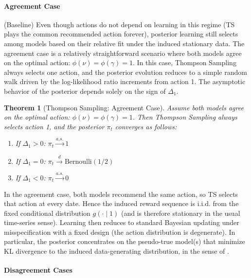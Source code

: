 \documentclass[12pt]{article}
\newtheorem{theorem}{Theorem}
\begin{document}
\paragraph{Agreement Case} (Baseline) Even though actions do not depend on learning in this regime (TS plays the common recommended action forever), posterior learning still selects among models based on their relative fit under the induced stationary data. The agreement case is a relatively straightforward scenario where both models agree on the optimal action: $\phi(\nu) = \phi(\gamma) = 1$. In this case, Thompson Sampling always selects one action, and the posterior evolution reduces to a simple random walk driven by the log-likelihood ratio increments from action 1. The asymptotic behavior of the posterior depends solely on the sign of $\Delta_1$.

\begin{theorem}[Thompson Sampling: Agreement Case]
\label{thm:agreement_case}
Assume both models agree on the optimal action: $\phi(\nu) = \phi(\gamma) = 1$. Then Thompson Sampling always selects action 1, and the posterior $\pi_t$ converges as follows:
\begin{enumerate}
    \item[(i)] If $\Delta_1 > 0$: $\pi_t \xrightarrow{a.s.} 1$
    \item[(ii)] If $\Delta_1 = 0$: $\pi_t \xrightarrow{d} \text{Bernoulli}(1/2)$
    \item[(iii)] If $\Delta_1 < 0$: $\pi_t \xrightarrow{a.s.} 0$
\end{enumerate}
\end{theorem}

In the agreement case, both models recommend the same action, so TS selects that action at every date. Hence the induced reward sequence is i.i.d. from the fixed conditional distribution $g(\cdot\mid 1)$ (and is therefore stationary in the usual time-series sense). Learning then reduces to standard Bayesian updating under misspecification with a fixed design (the action distribution is degenerate). In particular, the posterior concentrates on the pseudo-true model(s) that minimize KL divergence to the induced data-generating distribution, in the sense of \citet{berkLimitingBehaviorPosterior1966}.

\paragraph{Disagreement Cases}
\end{document}
